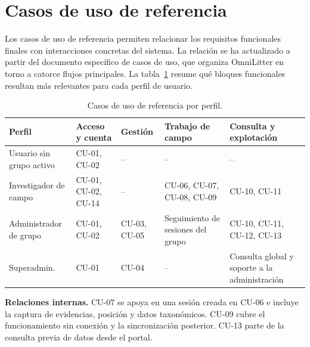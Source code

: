 \section{Casos de uso de referencia}

Los casos de uso de referencia permiten relacionar los requisitos funcionales
finales con interacciones concretas del sistema. La relación se ha actualizado a
partir del documento específico de casos de uso, que organiza OmniLitter en torno
a catorce flujos principales. La tabla~\ref{tab:casos_uso_perfil} resume qué
bloques funcionales resultan más relevantes para cada perfil de usuario.

\begin{table}[H]
\centering
\caption{Casos de uso de referencia por perfil.}
\label{tab:casos_uso_perfil}
\scriptsize
\renewcommand{\arraystretch}{1.25}
\begin{tabularx}{\textwidth}{
  >{\raggedright\arraybackslash}p{2.35cm}
  >{\raggedright\arraybackslash}X
  >{\raggedright\arraybackslash}X
  >{\raggedright\arraybackslash}X
  >{\raggedright\arraybackslash}X}
\toprule
\textbf{Perfil} & \textbf{Acceso y cuenta} & \textbf{Gestión} &
\textbf{Trabajo de campo} & \textbf{Consulta y explotación} \\
\midrule
Usuario sin grupo activo &
CU-01, CU-02 &
-- &
-- &
-- \\
\addlinespace
Investigador de campo &
CU-01, CU-02, CU-14 &
-- &
CU-06, CU-07, CU-08, CU-09 &
CU-10, CU-11 \\
\addlinespace
Administrador de grupo &
CU-01, CU-02 &
CU-03, CU-05 &
Seguimiento de sesiones del grupo &
CU-10, CU-11, CU-12, CU-13 \\
\addlinespace
Superadmin. &
CU-01 &
CU-04 &
-- &
Consulta global y soporte a la administración \\
\bottomrule
\end{tabularx}
\vspace{0.2cm}
\begin{minipage}{0.94\textwidth}
\scriptsize
\textbf{Relaciones internas.} CU-07 se apoya en una sesión creada en CU-06 e
incluye la captura de evidencias, posición y datos taxonómicos. CU-09 cubre el
funcionamiento sin conexión y la sincronización posterior. CU-13 parte de la
consulta previa de datos desde el portal.
\end{minipage}
\end{table}

